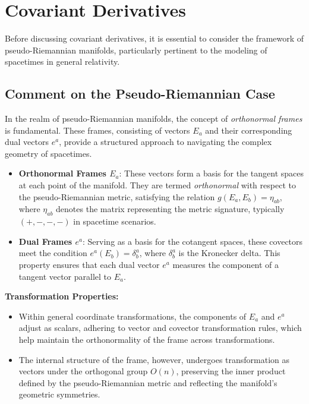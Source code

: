 \documentclass{article}
\begin{document}
\section{Covariant Derivatives} 

Before discussing covariant derivatives, it is essential to consider the framework of pseudo-Riemannian manifolds, particularly pertinent to the modeling of spacetimes in general relativity.

\subsection*{Comment on the Pseudo-Riemannian Case}

In the realm of pseudo-Riemannian manifolds, the concept of \emph{orthonormal frames} is fundamental. These frames, consisting of vectors \(E_a\) and their corresponding dual vectors \(e^a\), provide a structured approach to navigating the complex geometry of spacetimes.

\begin{itemize}
    \item \textbf{Orthonormal Frames \(E_a\)}: These vectors form a basis for the tangent spaces at each point of the manifold. They are termed \emph{orthonormal} with respect to the pseudo-Riemannian metric, satisfying the relation \(g(E_a, E_b) = \eta_{ab}\), where \(\eta_{ab}\) denotes the matrix representing the metric signature, typically \((+,-,-,-)\) in spacetime scenarios.
    
    \item \textbf{Dual Frames \(e^a\)}: Serving as a basis for the cotangent spaces, these covectors meet the condition \(e^a(E_b) = \delta^a_b\), where \(\delta^a_b\) is the Kronecker delta. This property ensures that each dual vector \(e^a\) measures the component of a tangent vector parallel to \(E_a\).
\end{itemize}

\textbf{Transformation Properties:}
\begin{itemize}
    \item Within general coordinate transformations, the components of \(E_a\) and \(e^a\) adjust as scalars, adhering to vector and covector transformation rules, which help maintain the orthonormality of the frame across transformations.

    \item The internal structure of the frame, however, undergoes transformation as vectors under the orthogonal group \(O(n)\), preserving the inner product defined by the pseudo-Riemannian metric and reflecting the manifold's geometric symmetries.
\end{itemize}
\end{document}
